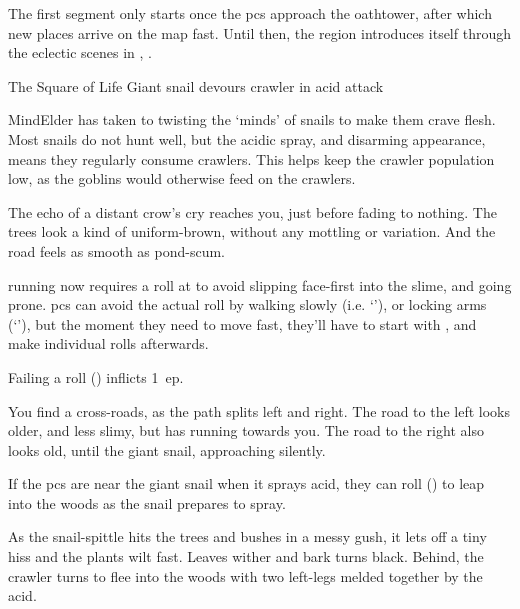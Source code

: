 \begin{multicols}{2}
\noindent
The first \gls{segment} only starts once the \glspl{pc} approach the \gls{oathtower}, after which new places arrive on the map fast.
Until then, the \gls{region} introduces itself through the eclectic scenes in , .

\label{ravencopsIntro}

{The Square of Life}%
{Giant snail devours \gls{crawler} in acid attack}%

\begin{exampletext}
  \Gls{MindElder} has taken to twisting the `minds' of snails to make them crave flesh.
  Most snails do not hunt well, but the acidic spray, and disarming appearance, means they regularly consume \glspl{crawler}.
  This helps keep the \gls{crawler} population low, as the goblins would otherwise feed on the \glspl{crawler}.
\end{exampletext}

\begin{boxtext}
  The echo of a distant crow's cry reaches you, just before fading to nothing.
  The trees look a kind of uniform-brown, without any mottling or variation.
  And the road feels as smooth as pond-scum.
\end{boxtext}

\Gls{running} now requires a  roll at \tn[7] to avoid slipping face-first into the slime, and going prone.%
\Glspl{pc} can avoid the actual roll by walking slowly (i.e. `'), or locking arms (`'), but the moment they need to move fast, they'll have to start with , and make individual rolls afterwards.

Failing a  roll (\tn[7]) inflicts 1~\gls{ep}.

\begin{boxtext}
  You find a cross-roads, as the path splits left and right.
  The road to the left looks older, and less slimy, but has  running towards you.
  The road to the right also looks old, until the giant snail, approaching silently.
\end{boxtext}

If the \glspl{pc} are near the giant snail when it sprays acid, they can roll  (\tn[7]) to leap into the woods as the snail prepares to spray.

\begin{boxtext}
  As the snail-spittle hits the trees and bushes in a messy gush, it lets off a tiny hiss and the plants wilt fast.
  Leaves wither and bark turns black.
  Behind, the \gls{crawler} turns to flee into the woods with two left-legs melded together by the acid.
\end{boxtext}


\end{multicols}
